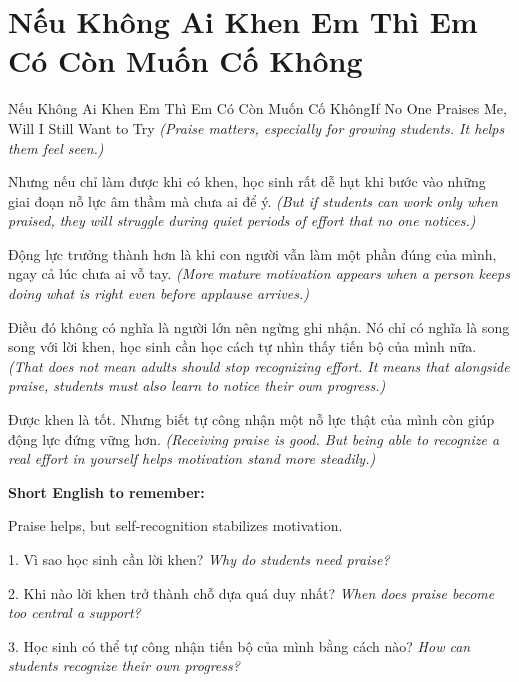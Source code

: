 \section{Nếu Không Ai Khen Em Thì Em Có Còn Muốn Cố Không}
\begin{truyen}{Nếu Không Ai Khen Em Thì Em Có Còn Muốn Cố Không}{If No One Praises Me, Will I Still Want to Try}
\textit{(Praise matters, especially for growing students. It helps them feel seen.)}

Nhưng nếu chỉ làm được khi có khen, học sinh rất dễ hụt khi bước vào những giai đoạn nỗ lực âm thầm mà chưa ai để ý.
\textit{(But if students can work only when praised, they will struggle during quiet periods of effort that no one notices.)}

Động lực trưởng thành hơn là khi con người vẫn làm một phần đúng của mình, ngay cả lúc chưa ai vỗ tay.
\textit{(More mature motivation appears when a person keeps doing what is right even before applause arrives.)}

Điều đó không có nghĩa là người lớn nên ngừng ghi nhận. Nó chỉ có nghĩa là song song với lời khen, học sinh cần học cách tự nhìn thấy tiến bộ của mình nữa.
\textit{(That does not mean adults should stop recognizing effort. It means that alongside praise, students must also learn to notice their own progress.)}
\end{truyen}

\begin{baihoc}
Được khen là tốt. Nhưng biết tự công nhận một nỗ lực thật của mình còn giúp động lực đứng vững hơn.
\textit{(Receiving praise is good. But being able to recognize a real effort in yourself helps motivation stand more steadily.)}
\end{baihoc}

\begin{ghinhoanh}
\textbf{Short English to remember:}

Praise helps, but self-recognition stabilizes motivation.

\end{ghinhoanh}

\begin{tuhocnhanh}
1. Vì sao học sinh cần lời khen? \textit{Why do students need praise?}

2. Khi nào lời khen trở thành chỗ dựa quá duy nhất? \textit{When does praise become too central a support?}

3. Học sinh có thể tự công nhận tiến bộ của mình bằng cách nào? \textit{How can students recognize their own progress?}
\end{tuhocnhanh}
\ngancach

